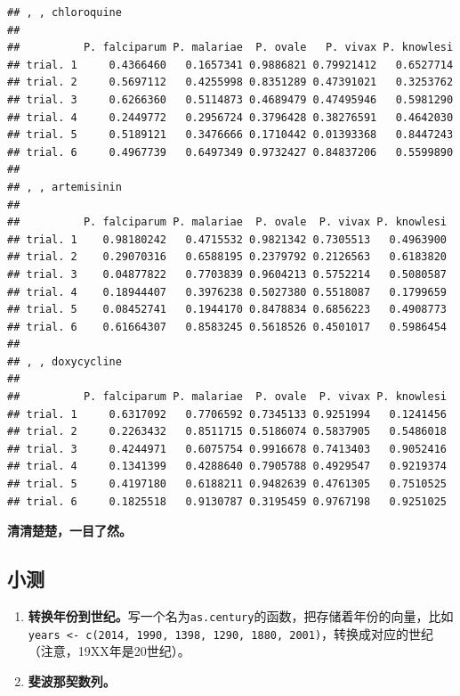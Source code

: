 \documentclass[]{book}
\providecommand{\tightlist}{%
  \setlength{\itemsep}{0pt}\setlength{\parskip}{0pt}}
\begin{document}
\begin{verbatim}
## , , chloroquine
## 
##          P. falciparum P. malariae  P. ovale   P. vivax P. knowlesi
## trial. 1     0.4366460   0.1657341 0.9886821 0.79921412   0.6527714
## trial. 2     0.5697112   0.4255998 0.8351289 0.47391021   0.3253762
## trial. 3     0.6266360   0.5114873 0.4689479 0.47495946   0.5981290
## trial. 4     0.2449772   0.2956724 0.3796428 0.38276591   0.4642030
## trial. 5     0.5189121   0.3476666 0.1710442 0.01393368   0.8447243
## trial. 6     0.4967739   0.6497349 0.9732427 0.84837206   0.5599890
## 
## , , artemisinin
## 
##          P. falciparum P. malariae  P. ovale  P. vivax P. knowlesi
## trial. 1    0.98180242   0.4715532 0.9821342 0.7305513   0.4963900
## trial. 2    0.29070316   0.6588195 0.2379792 0.2126563   0.6183820
## trial. 3    0.04877822   0.7703839 0.9604213 0.5752214   0.5080587
## trial. 4    0.18944407   0.3976238 0.5027380 0.5518087   0.1799659
## trial. 5    0.08452741   0.1944170 0.8478834 0.6856223   0.4908773
## trial. 6    0.61664307   0.8583245 0.5618526 0.4501017   0.5986454
## 
## , , doxycycline
## 
##          P. falciparum P. malariae  P. ovale  P. vivax P. knowlesi
## trial. 1     0.6317092   0.7706592 0.7345133 0.9251994   0.1241456
## trial. 2     0.2263432   0.8511715 0.5186074 0.5837905   0.5486018
## trial. 3     0.4244971   0.6075754 0.9916678 0.7413403   0.9052416
## trial. 4     0.1341399   0.4288640 0.7905788 0.4929547   0.9219374
## trial. 5     0.4197180   0.6188211 0.9482639 0.4761305   0.7510525
## trial. 6     0.1825518   0.9130787 0.3195459 0.9767198   0.9251025
\end{verbatim}

\textbf{清清楚楚，一目了然。}

\hypertarget{test-base}{%
\subsection{小测}\label{test-base}}

\begin{enumerate}
\def\labelenumi{(\arabic{enumi})}
\tightlist
\item
  \textbf{转换年份到世纪。}写一个名为\texttt{as.century}的函数，把存储着年份的向量，比如\texttt{years\ \textless{}-\ c(2014,\ 1990,\ 1398,\ 1290,\ 1880,\ 2001)}，转换成对应的世纪（注意，19XX年是20世纪）。
\item
  \textbf{斐波那契数列。}
\end{enumerate}
\end{document}
